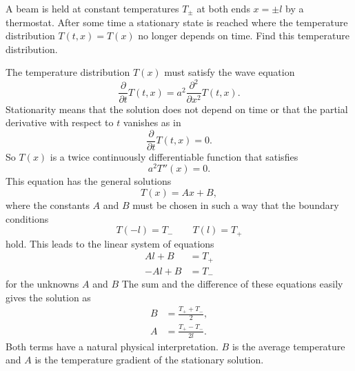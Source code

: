 A beam is held at constant temperatures $T_\pm$ at both ends $x=\pm l$
by a thermostat.
After some time a stationary state is reached where the temperature
distribution
$T(t,x)=T(x)$ no longer depends on time.
Find this temperature distribution.

\begin{loesung}
The temperature distribution $T(x)$ must satisfy the wave equation
\[
\frac{\partial}{\partial t}T(t,x)=
a^2\frac{\partial^2}{\partial x^2}T(t,x).
\]
Stationarity means that the solution does not depend on time or that
the partial derivative with respect to $t$ vanishes as in
\[
\frac{\partial}{\partial t}T(t,x)=0.
\]
So $T(x)$ is a twice continuously differentiable function that 
satisfies
\[
a^2T''(x)=0.
\]
This equation has the general solutions
\[
T(x)=Ax+B,
\]
where the constants $A$ and $B$ must be chosen in such a way that the
boundary conditions 
\[
T(-l)=T_-\qquad T(l)=T_+
\]
hold.
This leads to the linear system of equations
\begin{align*}
Al+B&=T_+\\
-Al+B&=T_-
\end{align*}
for the unknowns $A$ and $B$
The sum and the difference of these equations easily gives the solution as
\begin{align*}
B&=\frac{T_++T_-}{2},
\\
A&=\frac{T_+-T_-}{2l}.
\end{align*}
Both terms have a natural physical interpretation.
$B$ is the average temperature and $A$ is the temperature gradient
of the stationary solution.
\end{loesung}
